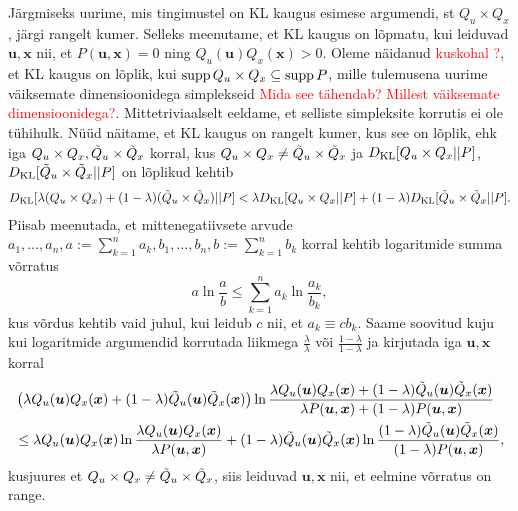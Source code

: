 Järgmiseks uurime, mis tingimustel on KL kaugus esimese argumendi, st $Q_u \times Q_x$, järgi rangelt kumer. Selleks meenutame, et KL kaugus on lõpmatu, kui leiduvad $\bm{u},\bm{x}$ nii, et $P(\bm{u},\bm{x}) = 0$ ning $Q_u(\bm{u})Q_x(\bm{x}) > 0$. Oleme näidanud \textcolor{red}{kuskohal ?}, et KL kaugus on lõplik, kui $\operatorname{supp} Q_u \times Q_x \subseteq \operatorname{supp} P$, mille tulemusena uurime väiksemate dimensioonidega simplekseid \textcolor{red}{Mida see tähendab? Millest väiksemate dimensioonidega?}. Mittetriviaalselt eeldame, et selliste simpleksite korrutis ei ole tühihulk. Nüüd näitame, et KL kaugus on rangelt kumer, kus see on lõplik, ehk iga $Q_u\times Q_x, \Tilde{Q}_u\times \Tilde{Q}_x$ korral, kus $Q_u\times Q_x \ne \Tilde{Q}_u\times \Tilde{Q}_x$ ja $D_{\mathrm{KL}}[Q_u \times Q_x || P]$, $D_{\mathrm{KL}}[\Tilde{Q}_u \times \Tilde{Q}_x|| P]$ on lõplikud kehtib
\begin{align*}
\label{ineq:strong_convexity}
D_{\mathrm{KL}}[\lambda (Q_u\times Q_x) + (1-\lambda) (\Tilde{Q}_u\times \Tilde{Q}_x) || P] < \lambda D_{\mathrm{KL}}[Q_u\times Q_x  || P] + (1 - \lambda) D_{\mathrm{KL}}[\Tilde{Q}_u\times \Tilde{Q}_x || P].
\end{align*}
Piisab meenutada, et mittenegatiivsete arvude $a_1,\ldots,a_n, a:=\sum_{k=1}^n a_k, b_1,\ldots,b_n, b:=\sum_{k=1}^n b_k$ korral kehtib logaritmide summa võrratus
$$ a \ln \frac{a}{b} \le \sum_{k=1}^n a_k \ln \frac{a_k}{b_k}, $$
kus võrdus kehtib vaid juhul, kui leidub $c$ nii, et $a_k \equiv cb_k$. Saame soovitud kuju kui logaritmide argumendid korrutada liikmega $\frac{\lambda}{\lambda}$ või $\frac{1-\lambda}{1-\lambda} $ ja kirjutada iga $\bm{u},\bm{x}$ korral
\begin{align*}
    & \left( \lambda Q_u(\bm{u})Q_x(\bm{x}) + (1-\lambda) \Tilde{Q}_u(\bm{u})\Tilde{Q}_x(\bm{x}) \right) \ln \frac{\lambda Q_u(\bm{u})Q_x(\bm{x}) + (1-\lambda) \Tilde{Q}_u(\bm{u})\Tilde{Q}_x(\bm{x}) }{\lambda P(\bm{u},\bm{x}) + (1-\lambda)P(\bm{u},\bm{x})}\\
    &\le \lambda Q_u(\bm{u})Q_x(\bm{x}) \ln \frac{\lambda Q_u(\bm{u})Q_x(\bm{x})}{\lambda P(\bm{u},\bm{x})} + (1-\lambda)\Tilde{Q}_u(\bm{u})\Tilde{Q}_x(\bm{x}) \ln \frac{(1-\lambda) \Tilde{Q}_u(\bm{u})\Tilde{Q}_x(\bm{x})}{(1-\lambda)P(\bm{u},\bm{x})},
\end{align*}
kusjuures et $Q_u\times Q_x \ne \Tilde{Q}_u\times \Tilde{Q}_x$, siis leiduvad $\bm{u},\bm{x}$ nii, et eelmine võrratus on range.

